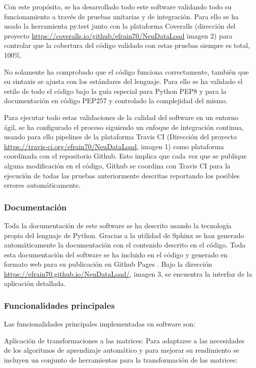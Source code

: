 Con este propósito, se ha desarrollado todo este software validando todo su funcionamiento a través de pruebas unitarias y de integración. Para ello se ha usado la herramienta py.test \cite{Pytest:Documentation} junto con la plataforma Coveralls \cite{CoverallsStatistics} (dirección del proyecto \url{https://coveralls.io/github/efrain70/NeuDataLoad} imagen 2) para controlar que la cobertura del código validado con estas pruebas siempre es total, 100\%.

No solamente ha comprobado que el código funciona correctamente, también que su sintaxis se ajusta con los estándares del lenguaje. Para ello se ha validado el estilo de todo el código bajo la guía especial para Python PEP8 \cite{PEPPython.orgb} y para la documentación en código PEP257 \cite{PEPPython.org} y controlado la complejidad del mismo.

Para ejecutar todo estas validaciones de la calidad del software en un entorno ágil, se ha  configurado el proceso siguiendo un enfoque de integración continua, usando para ello pipelines de la plataforma Travis CI \cite{TravisConfidence} (Dirección del proyecto \url{https://travis-ci.org/efrain70/NeuDataLoad}, imagen 1) como plataforma coordinada con el repositorio Github. Esto implica que cada vez que se publique alguna modificación en el código, Github se coordina con Travis CI para la ejecución de todas las pruebas anteriormente descritas reportando los posibles errores automáticamente.

\subsubsection{Documentación}
Toda la documentación de este software se ha descrito usando la tecnología propia del lenguaje de Python. Gracias a la utilidad de Sphinx \cite{OverviewDocumentation} se han generado automáticamente la documentación con el contenido descrito en el código. Toda esta documentación del software se ha incluido en el código y generado en formato web para su publicación en Github Pages \cite{GitHubLive.}. Bajo la dirección \url{https://efrain70.github.io/NeuDataLoad/}, imagen 3, se encuentra la interfaz de la aplicación detallada.

\subsubsection{Funcionalidades principales}
Las funcionalidades principales implementadas en software son:

Aplicación de transformaciones a las matrices:
Para adaptarse a las necesidades de los algoritmos de aprendizaje automático y para mejorar su rendimiento se incluyen un conjunto de herramientas para la transformación de las matrices:

